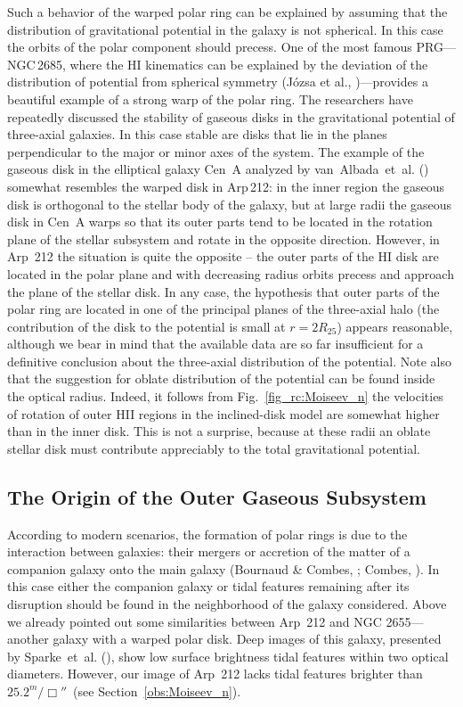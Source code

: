 \documentclass{ab}
\begin{document}
Such a behavior of the warped polar ring can be explained by
assuming that the distribution of gravitational potential in the
galaxy is not spherical. In this case the orbits of the polar
component should precess. One of the most famous PRG---NGC\,2685,
where the HI kinematics can be explained by the deviation of the
distribution of potential from spherical
symmetry (J\'{o}zsa et al., \cite{jozsa04:Moiseev_n})---provides a beautiful example
of a strong warp of the polar ring. The researchers have
repeatedly discussed the stability of gaseous disks in the
gravitational potential of three-axial galaxies.  In this case
stable are disks that lie in the planes perpendicular to the major
or minor axes of the system. The example of the gaseous disk in
the elliptical galaxy Cen~A analyzed by
van~Albada~et~al. (\cite{vanalbada:Moiseev_n}) somewhat resembles
the warped disk in Arp\,212: in the inner region the gaseous disk
is orthogonal to the stellar body of the galaxy, but at large
radii the gaseous disk in Cen~A warps so that
its outer parts tend to be located in the rotation plane of the
stellar subsystem and rotate in the opposite direction. However,
in   Arp~212 the situation is quite the opposite --   the outer
parts of the HI disk are located in the polar plane and with
decreasing radius orbits precess and approach the plane of the
stellar disk. In any case, the hypothesis that outer parts of the
polar ring are located in one of the principal planes of the
three-axial halo (the contribution of the disk to the potential is
small at $r=2R_{25}$) appears reasonable, although we bear in mind
that the available data are so far insufficient for a definitive
conclusion about the three-axial distribution of the potential.
Note also that the suggestion for oblate distribution of the
potential can be found inside the optical radius. Indeed, it
follows from Fig.~\ref{fig_rc:Moiseev_n}  the velocities of
rotation of outer HII regions in the inclined-disk model are
somewhat higher than in the inner disk. This is not a surprise,
because at these radii an oblate stellar disk must contribute appreciably to the total gravitational potential.

\subsection{The Origin of the Outer Gaseous Subsystem}

According to modern scenarios, the formation of polar rings is due
to the interaction between galaxies: their mergers or accretion of
the matter of a companion galaxy onto the main
galaxy (Bournaud   \& Combes, \cite{bc03:Moiseev_n}; Combes, \cite{comb06:Moiseev_n}). In this case either
the companion galaxy or tidal features remaining after its
disruption should be found in the neighborhood of the galaxy
considered. Above we already pointed out some similarities between
Arp~212 and NGC 2655---another galaxy with a warped polar disk.
Deep images of this galaxy, presented by
Sparke~et~al. (\cite{sparke08:Moiseev_n}), show low surface
brightness tidal features within two optical diameters. However,
our image of Arp~212 lacks tidal features brighter than
$25.2^{m}/\Box''$~(see Section~\ref{obs:Moiseev_n}).
\end{document}
